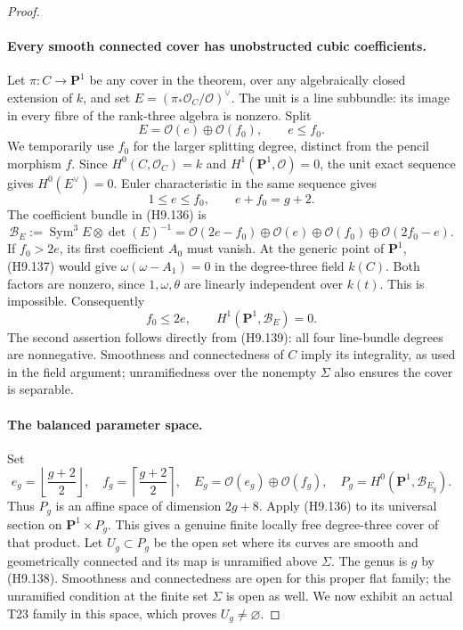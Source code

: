 \begin{proof}
\paragraph{Every smooth connected cover has unobstructed cubic coefficients.}
Let $\pi:C\to\mathbf P^1$ be any cover in the theorem,
over any algebraically closed extension of $k$, and set
$E=(\pi_*\mathcal O_C/\mathcal O)^\vee$.
The unit is a line subbundle: its image in every fibre
of the rank-three algebra is nonzero. Split
\[
                  E=\mathcal O(e)\oplus\mathcal O(f_0),
                            \qquad e\le f_0.
\]
We temporarily use $f_0$ for the larger splitting degree,
distinct from the pencil morphism $f$.
Since $H^0(C,\mathcal O_C)=k$ and
$H^1(\mathbf P^1,\mathcal O)=0$, the unit exact sequence
gives $H^0(E^\vee)=0$. Euler characteristic in the same
sequence gives
\[
                     1\le e\le f_0,\qquad e+f_0=g+2.
                                                               \tag{H9.138}
\]
The coefficient bundle in (H9.136) is
\[
 \mathcal B_E:=\operatorname{Sym}^3E\otimes\det(E)^{-1}
  =\mathcal O(2e-f_0)\oplus\mathcal O(e)
          \oplus\mathcal O(f_0)\oplus\mathcal O(2f_0-e).
                                                               \tag{H9.139}
\]
If $f_0>2e$, its first coefficient $A_0$ must vanish.
At the generic point of $\mathbf P^1$, (H9.137) would
give $\omega(\omega-A_1)=0$ in the degree-three field
$k(C)$. Both factors are nonzero, since $1,\omega,\theta$
are linearly independent over $k(t)$. This is impossible.
Consequently
\[
                         f_0\le2e,
               \qquad H^1(\mathbf P^1,\mathcal B_E)=0.
                                                               \tag{H9.140}
\]
The second assertion follows directly from (H9.139):
all four line-bundle degrees are nonnegative. Smoothness
and connectedness of $C$ imply its integrality, as used
in the field argument; unramifiedness over the nonempty
$\Sigma$ also ensures the cover is separable.

\paragraph{The balanced parameter space.}
Set
\[
 e_g=\left\lfloor\frac{g+2}{2}\right\rfloor,
 \quad f_g=\left\lceil\frac{g+2}{2}\right\rceil,
 \quad E_g=\mathcal O(e_g)\oplus\mathcal O(f_g),
 \quad P_g=H^0(\mathbf P^1,\mathcal B_{E_g}).
                                                               \tag{H9.141}
\]
Thus $P_g$ is an affine space of dimension $2g+8$.
Apply (H9.136) to its universal section on
$\mathbf P^1\times P_g$. This gives a genuine finite
locally free degree-three cover of that product.
Let $U_g\subset P_g$ be the open set where its curves
are smooth and geometrically connected and its map is
unramified above $\Sigma$. The genus is $g$ by (H9.138).
Smoothness and connectedness are open for this proper
flat family; the unramified condition at the finite set
$\Sigma$ is open as well. We now exhibit an actual
T23 family in this space, which proves $U_g\ne\varnothing$.


\end{proof}
